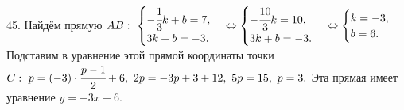 45. Найдём прямую $AB:\ \begin{cases} -\cfrac{1}{3}k+b=7,\\ 3k+b=-3.\end{cases}\Leftrightarrow\begin{cases} -\cfrac{10}{3}k=10,\\ 3k+b=-3.\end{cases}
\Leftrightarrow\begin{cases} k=-3,\\ b=6.\end{cases}$ Подставим в уравнение этой прямой координаты точки $C:\ p=(-3)\cdot\cfrac{p-1}{2}+6,\
2p=-3p+3+12,\ 5p=15,\ p=3.$ Эта прямая имеет уравнение $y=-3x+6.$\\
